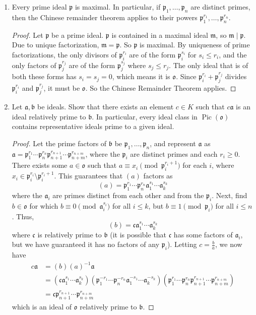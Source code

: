 \documentclass[10pt]{article}
\newcommand{\p}{\mathfrak{p}}
\renewcommand{\a}{\mathfrak{a}}
\renewcommand{\b}{\mathfrak{b}}
\renewcommand{\c}{\mathfrak{c}}
\renewcommand{\o}{\mathfrak{o}}
\newcommand{\m}{\mathfrak{m}}
\DeclareMathOperator*{\Pic}{Pic}
\begin{document}
\begin{enumerate}
\begin{enumerate}
\begin{proof}
If $\a+\b = \o$, then every common divisor of $\a$ and $\b$ contains $\o$, hence the only one is $\o$.  So $\a$ and $\b$ are relatively prime.  Conversely, if the only common divisor of $\a$ and $\b$ is $\o$, then the only divisor of $\a+\b$ is $\o$.  So the only ideal containing $\a+\b$ is $\o$.  So $\a+\b$ is not contained in a maximal ideal, hence it must be $\o$.
\end{proof}
\end{enumerate}
\item Every prime ideal $\p$ is maximal.  In particular, if $\p_1, \dots , \p_n$ are distinct primes, then the Chinese remainder theorem applies to their powers $\p_1^{r_1}, \dots , \p_n^{r_n}$.

\begin{proof}
Let $\p$ be a prime ideal.  $\p$ is contained in a maximal ideal $\m$, so $\m \mid \p$.  Due to unique factorization, $\m = \p$.  So $\p$ is maximal.  By uniqueness of prime factorizations, the only divisors of $\p_i^{r_i}$ are of the form $\p_i^{s_i}$ for $s_i \leq r_i$, and the only factors of $\p_j^{r_j}$ are of the form $\p_j^{s_j}$ where $s_j \leq r_j$.  The only ideal that is of both these forms has $s_i = s_j = 0$, which means it is $\o$.  Since $\p_i^{r_i} + \p_j^{r_j}$ divides $\p_i^{r_i}$ and $\p_j^{r_j}$, it must be $\o$.  So the Chinese Remainder Theorem applies.
\end{proof}

\item Let $\a,\b$ be ideals.  Show that there exists an element $c \in K$ such that $c\a$ is an ideal relatively prime to $\b$.  In particular, every ideal class in $\Pic(\o)$ contains representative ideals prime to a given ideal.

\begin{proof}
Let the prime factors of $\b$ be $\p_1, \dots , \p_n$, and represent $\a$ as $\a = \p_1^{r_1} \cdots \p_n^{r_n}\p_{n+1}^{r_{n+1}} \cdots \p_{n+m}^{r_{n+m}}$, where the $\p_i$ are distinct primes and each $r_i \geq 0$.  There exists some $a \in \o$ such that $a \equiv x_i \pmod{\p_i^{r_i+1}}$ for each $i$, where $x_i \in \p_i^{r_i} \setminus \p_i^{r_i+1}$.  This guarantees that $(a)$ factors as
$$
(a) = \p_1^{r_1} \cdots \p_n^{r_n}\a_{1}^{s_1} \cdots \a_{k}^{s_{k}}
$$
where the $\a_i$ are primes distinct from each other and from the $\p_i$.  Next, find $b \in \o$ for which $b \equiv 0 \pmod{\a_i^{s_i}}$ for all $i \leq k$, but $b \equiv 1 \pmod{\p_i}$ for all $i \leq n$.  Thus,
$$
(b) = \c\a_{1}^{s_1} \cdots \a_{k}^{s_{k}}
$$
where $\c$ is relatively prime to $\b$ (it is possible that $\c$ has some factors of $\a_i$, but we have guaranteed it has no factors of any $\p_i$).  Letting $c = \frac{b}{a}$, we now have
\begin{align*}
c\a &= (b)(a)^{-1}\a \\
&= (\c\a_{1}^{s_1} \cdots \a_{k}^{s_{k}})(\p_1^{-r_1} \cdots \p_n^{-r_n}\a_{1}^{-s_1} \cdots \a_{k}^{-s_{k}})(\p_1^{r_1} \cdots \p_n^{r_n}\p_{n+1}^{r_{n+1}} \cdots \p_{n+m}^{r_{n+m}}) \\
&= \c\p_{n+1}^{r_{n+1}} \cdots \p_{n+m}^{r_{n+m}}
\end{align*}
which is an ideal of $\o$ relatively prime to $\b$.


\end{proof}
\end{enumerate}
\end{document}
